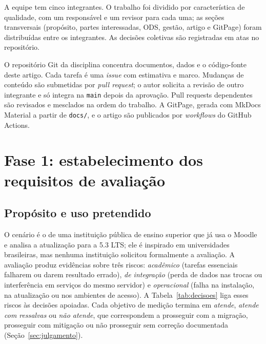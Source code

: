 \documentclass[12pt]{article}
\begin{document}
A equipe tem cinco integrantes. O trabalho foi dividido por característica de qualidade, com um responsável e um revisor para cada uma; as seções transversais (propósito, partes interessadas, ODS, gestão, artigo e GitPage) foram distribuídas entre os integrantes. As decisões coletivas são registradas em atas no repositório.

O repositório Git da disciplina concentra documentos, dados e o código-fonte deste artigo. Cada tarefa é uma \emph{issue} com estimativa e marco. Mudanças de conteúdo são submetidas por \emph{pull request}; o autor solicita a revisão de outro integrante e só integra na \texttt{main} depois da aprovação. Pull requests dependentes são revisados e mesclados na ordem do trabalho. A GitPage, gerada com MkDocs Material a partir de \texttt{docs/}, e o artigo são publicados por \emph{workflows} do GitHub Actions.

\section{Fase 1: estabelecimento dos requisitos de avaliação}
\label{sec:fase1}

\subsection{Propósito e uso pretendido}

O cenário é o de uma instituição pública de ensino superior que já usa o Moodle e analisa a atualização para a 5.3 LTS; ele é inspirado em universidades brasileiras, mas nenhuma instituição solicitou formalmente a avaliação. A avaliação produz evidências sobre três riscos: \emph{acadêmico} (tarefas essenciais falharem ou darem resultado errado), \emph{de integração} (perda de dados nas trocas ou interferência em serviços do mesmo servidor) e \emph{operacional} (falha na instalação, na atualização ou nos ambientes de acesso). A Tabela~\ref{tab:decisoes} liga esses riscos às decisões apoiadas. Cada objetivo de medição termina em \emph{atende}, \emph{atende com ressalvas} ou \emph{não atende}, que correspondem a prosseguir com a migração, prosseguir com mitigação ou não prosseguir sem correção documentada (Seção~\ref{sec:julgamento}).
\end{document}
